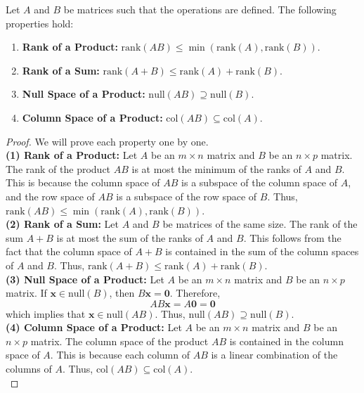 \documentclass[openany]{book}
\begin{document}
\begin{mytheorem}
Let $A$ and $B$ be matrices such that the operations are defined. The following properties hold:
\begin{enumerate}
    \item \textbf{Rank of a Product:} $\text{rank}(AB) \leq \min(\text{rank}(A), \text{rank}(B))$.
    \item \textbf{Rank of a Sum:} $\text{rank}(A + B) \leq \text{rank}(A) + \text{rank}(B)$.
    \item \textbf{Null Space of a Product:} $\text{null}(AB) \supseteq \text{null}(B)$.
    \item \textbf{Column Space of a Product:} $\text{col}(AB) \subseteq \text{col}(A)$.
\end{enumerate}
\end{mytheorem}
\begin{proof}
    We will prove each property one by one. \\
    \textbf{(1) Rank of a Product:} Let $A$ be an $m \times n$ matrix and $B$ be an $n \times p$ matrix. The rank of the product $AB$ is at most the minimum of the ranks of $A$ and $B$. This is because the column space of $AB$ is a subspace of the column space of $A$, and the row space of $AB$ is a subspace of the row space of $B$. Thus, $\text{rank}(AB) \leq \min(\text{rank}(A), \text{rank}(B))$. \\
    \textbf{(2) Rank of a Sum:} Let $A$ and $B$ be matrices of the same size. The rank of the sum $A + B$ is at most the sum of the ranks of $A$ and $B$. This follows from the fact that the column space of $A + B$ is contained in the sum of the column spaces of $A$ and $B$. Thus, $\text{rank}(A + B) \leq \text{rank}(A) + \text{rank}(B)$. \\
    \textbf{(3) Null Space of a Product:} Let $A$ be an $m \times n$ matrix and $B$ be an $n \times p$ matrix. If $\mathbf{x} \in \text{null}(B)$, then $B\mathbf{x} = \mathbf{0}$. Therefore, 
    \[
    AB\mathbf{x} = A\mathbf{0} = \mathbf{0}
    \]
    which implies that $\mathbf{x} \in \text{null}(AB)$. Thus, $\text{null}(AB) \supseteq \text{null}(B)$. \\
    \textbf{(4) Column Space of a Product:} Let $A$ be an $m \times n$ matrix and $B$ be an $n \times p$ matrix. The column space of the product $AB$ is contained in the column space of $A$. This is because each column of $AB$ is a linear combination of the columns of $A$. Thus, $\text{col}(AB) \subseteq \text{col}(A)$. \\
\end{proof}
\end{document}

